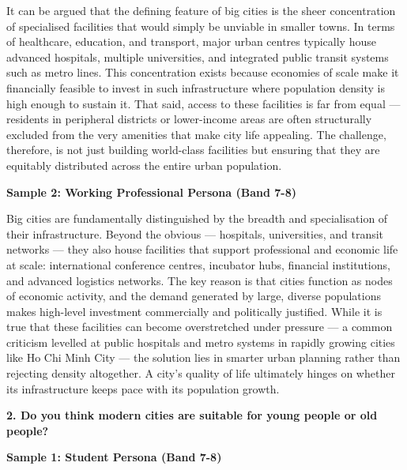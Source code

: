 It can be argued that the defining feature of big cities is the sheer concentration of specialised facilities that would simply be unviable in smaller towns. In terms of healthcare, education, and transport, major urban centres typically house advanced hospitals, multiple universities, and integrated public transit systems such as metro lines. This concentration exists because economies of scale make it financially feasible to invest in such infrastructure where population density is high enough to sustain it. That said, access to these facilities is far from equal — residents in peripheral districts or lower-income areas are often structurally excluded from the very amenities that make city life appealing. The challenge, therefore, is not just building world-class facilities but ensuring that they are equitably distributed across the entire urban population.

\textbf{Sample 2: Working Professional Persona (Band 7-8)}

Big cities are fundamentally distinguished by the breadth and specialisation of their infrastructure. Beyond the obvious — hospitals, universities, and transit networks — they also house facilities that support professional and economic life at scale: international conference centres, incubator hubs, financial institutions, and advanced logistics networks. The key reason is that cities function as nodes of economic activity, and the demand generated by large, diverse populations makes high-level investment commercially and politically justified. While it is true that these facilities can become overstretched under pressure — a common criticism levelled at public hospitals and metro systems in rapidly growing cities like Ho Chi Minh City — the solution lies in smarter urban planning rather than rejecting density altogether. A city's quality of life ultimately hinges on whether its infrastructure keeps pace with its population growth.

\separator

\begin{ieltsquestion}
\textbf{2. Do you think modern cities are suitable for young people or old people?}
\end{ieltsquestion}
\textbf{Sample 1: Student Persona (Band 7-8)}

